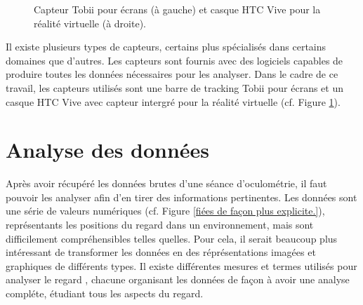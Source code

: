 \documentclass[12pt]{article}
\begin{document}
\begin{figure}[htpb]
  \centering
  \qquad
  \caption{Capteur Tobii \cite{img:tobii} pour écrans (à gauche) et casque HTC
    Vive \cite{img:htcvive} pour la réalité virtuelle (à droite).}
  \label{fig:materiel}
\end{figure}

Il existe plusieurs types de capteurs, certains plus spécialisés dans certains
domaines que d'autres. Les capteurs sont fournis avec des logiciels capables de
produire toutes les données nécessaires pour les analyser. Dans le cadre de ce
travail, les capteurs utilisés sont une barre de tracking Tobii pour écrans et
un casque HTC Vive avec capteur intergré pour la réalité virtuelle (cf. Figure
\ref{fig:materiel}).


\section{Analyse des données}

Après avoir récupéré les données brutes d'une séance d'oculométrie, il faut
pouvoir les analyser afin d'en tirer des informations pertinentes. Les
données sont une série de valeurs numériques (cf. Figure \ref{fiées de façon plus explicite.}),
représentants les positions du regard dans un environnement, mais sont
difficilement compréhensibles telles quelles. Pour cela, il serait beaucoup
plus intéressant de transformer les données en des réprésentations imagées et
graphiques de différents types. Il existe différentes mesures et termes
utilisés pour analyser le regard \cite{imotions:metrics}, chacune organisant
les données de façon à avoir une analyse compléte, étudiant tous les aspects du
regard.
\end{document}
